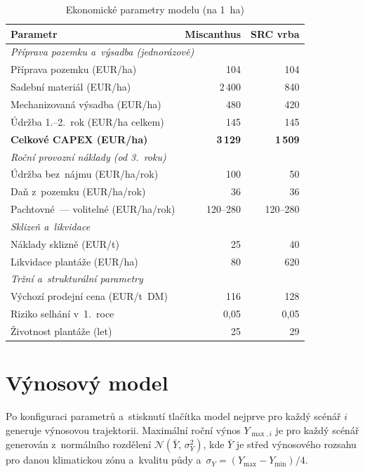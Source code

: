 \begin{table}[H]
\centering
\caption{Ekonomické parametry modelu (na 1~ha)}
\label{tab:naklady-aktualizovane}
\begin{tabular}{lrr}
\toprule
\textbf{Parametr} & \textbf{Miscanthus} & \textbf{SRC vrba} \\
\midrule
\multicolumn{3}{l}{\textit{Příprava pozemku a~výsadba (jednorázově)}} \\
\midrule
Příprava pozemku (EUR/ha)             & 104    & 104   \\
Sadební materiál (EUR/ha)             & 2\,400 & 840   \\
Mechanizovaná výsadba (EUR/ha)        & 480    & 420   \\
Údržba 1.--2.~rok (EUR/ha celkem)     & 145    & 145   \\
\textbf{Celkové CAPEX (EUR/ha)}       & \textbf{3\,129} & \textbf{1\,509} \\
\midrule
\multicolumn{3}{l}{\textit{Roční provozní náklady (od 3.~roku)}} \\
\midrule
Údržba bez~nájmu (EUR/ha/rok)         & 100      & 50       \\
Daň z~pozemku (EUR/ha/rok)            & 36       & 36       \\
Pachtovné~--- volitelné (EUR/ha/rok)  & 120--280 & 120--280 \\
\midrule
\multicolumn{3}{l}{\textit{Sklizeň a~likvidace}} \\
\midrule
Náklady sklizně (EUR/t)               & 25 & 40  \\
Likvidace plantáže (EUR/ha)           & 80 & 620 \\
\midrule
\multicolumn{3}{l}{\textit{Tržní a~strukturální parametry}} \\
\midrule
Výchozí prodejní cena (EUR/t~DM)      & 116  & 128  \\
Riziko selhání v~1.~roce              & 0{,}05 & 0{,}05 \\
Životnost plantáže (let)              & 25 & 29 \\
\bottomrule
\end{tabular}
\end{table}

\section{Výnosový model}
\label{sec:vynosovy-model}

Po konfiguraci parametrů a~stisknutí tlačítka  model nejprve pro každý scénář $i$ generuje výnosovou trajektorii. Maximální roční výnos $Y_{\max,i}$ je pro každý scénář generován z~normálního rozdělení $\mathcal{N}(\bar{Y},\, \sigma_Y^2)$, kde $\bar{Y}$ je střed výnosového rozsahu pro danou klimatickou zónu a~kvalitu půdy a~$\sigma_Y = (Y_{\max} - Y_{\min})/4$.

